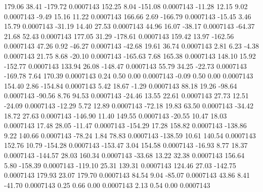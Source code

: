       179.06       38.41     -179.72     0.0007143
      152.25        8.04     -151.08     0.0007143
      -11.28       12.15        9.02     0.0007143
       -9.49       15.16       11.22     0.0007143
      166.66        2.69     -166.79     0.0007143
      -15.45        3.46       15.79     0.0007143
      -31.19       14.40       27.53     0.0007143
       44.96       16.07      -38.17     0.0007143
      -64.37       21.68       52.43     0.0007143
      177.05       31.29     -178.61     0.0007143
      159.42       13.97     -162.56     0.0007143
       47.26        0.92      -46.27     0.0007143
      -42.68       19.61       36.74     0.0007143
        2.81        6.23       -4.38     0.0007143
       21.75        8.68      -20.10     0.0007143
     -165.63        7.68      165.38     0.0007143
      148.10       15.92     -152.77     0.0007143
      133.94       26.08     -148.47     0.0007143
       55.79       34.25      -22.73     0.0007143
     -169.78        7.64      170.39     0.0007143
        0.24        0.50        0.00     0.0007143
       -0.09        0.50        0.00     0.0007143
      154.40        2.86     -154.84     0.0007143
        5.42       18.67       -1.29     0.0007143
       88.18       19.26      -98.64     0.0007143
      -90.56        8.76       94.53     0.0007143
      -24.46       13.55       22.61     0.0007143
       27.73       12.51      -24.09     0.0007143
      -12.29        5.72       12.89     0.0007143
      -72.18       19.83       63.50     0.0007143
      -34.42       18.72       27.63     0.0007143
     -146.90       11.40      149.55     0.0007143
      -20.55       10.47       18.03     0.0007143
       17.48       28.05      -11.47     0.0007143
     -154.29       17.28      158.82     0.0007143
     -138.86        9.22      140.66     0.0007143
      -78.24        1.84       78.83     0.0007143
     -138.59       10.61      140.54     0.0007143
      152.76       10.79     -154.28     0.0007143
     -153.47        3.04      154.58     0.0007143
      -16.93        8.77       18.37     0.0007143
     -144.57       28.03      160.34     0.0007143
      -33.68       13.22       32.38     0.0007143
      156.64        5.80     -158.39     0.0007143
     -119.10       25.31      139.31     0.0007143
      124.46       27.03     -142.75     0.0007143
      179.93       23.07      179.70     0.0007143
       84.54        9.04      -85.07     0.0007143
       43.86        8.41      -41.70     0.0007143
        0.25        0.66        0.00     0.0007143
        2.13        0.54        0.00     0.0007143
